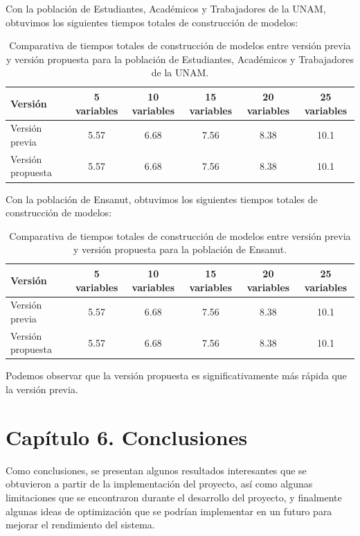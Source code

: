 \documentclass[
 12pt,
 letterpaper,
]{article}
\theoremstyle{teoremaBreak}
\theoremstyle{plain}
\theoremstyle{definition}
\begin{document}
Con la población de Estudiantes, Académicos y Trabajadores de la UNAM, obtuvimos los siguientes tiempos totales 
de construcción de modelos:

\begin{table}[htbp]
\centering
\caption{Comparativa de tiempos totales de construcción de modelos entre versión previa y versión propuesta para la 
población de Estudiantes, Académicos y Trabajadores de la UNAM.}
\label{tab:comparativa-version-previa-propuesta}
\begin{tabular}{|l|c|c|c|c|c|}
\hline
Versión & 5 variables & 10 variables & 15 variables & 20 variables & 25 variables \\
\hline
Versión previa &5.57  &6.68  &7.56  &8.38  &10.1  \\
\hline
Versión propuesta &5.57  &6.68  &7.56  &8.38  &10.1  \\
\hline
\end{tabular}
\end{table}

Con la población de Ensanut, obtuvimos los siguientes tiempos totales de construcción de modelos:
\begin{table}[htbp]
\centering
\caption{Comparativa de tiempos totales de construcción de modelos entre versión previa y versión propuesta para la población de Ensanut.}
\label{tab:comparativa-version-previa-propuesta-ensanut}
\begin{tabular}{|l|c|c|c|c|c|}
\hline
Versión & 5 variables & 10 variables & 15 variables & 20 variables & 25 variables \\
\hline
Versión previa &5.57  &6.68  &7.56  &8.38  &10.1  \\
\hline
Versión propuesta &5.57  &6.68  &7.56  &8.38  &10.1  \\
\hline
\end{tabular}
\end{table}

Podemos observar que la versión propuesta es significativamente más rápida que la versión previa.



\section{Capítulo 6. Conclusiones}\label{capuxedtulo-6.-conclusiones}
Como conclusiones, se presentan algunos resultados interesantes que se obtuvieron a partir de la implementación del proyecto, 
así como algunas limitaciones que se encontraron durante el desarrollo del proyecto, y finalmente algunas ideas de optimización 
que se podrían implementar en un futuro para mejorar el rendimiento del sistema.
\end{document}
